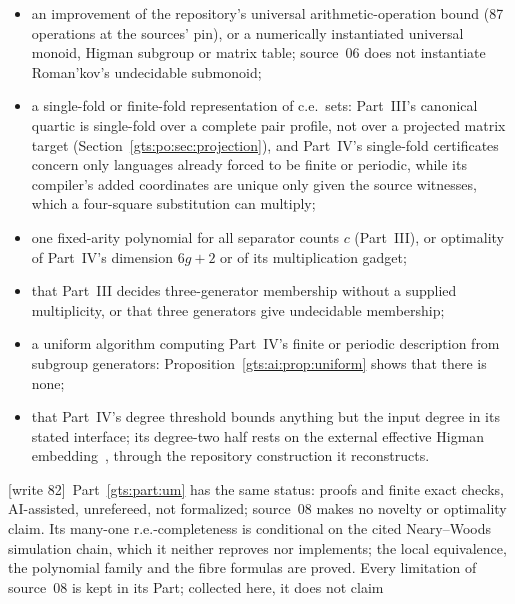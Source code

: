 \documentclass[11pt,letterpaper]{article}
\theoremstyle{definition}
\theoremstyle{remark}
\newcommand{\wtagc}{\textup{[write 82]}}
\begin{document}
\begin{itemize}
\item an improvement of the repository's universal arithmetic-operation bound (87 operations at the sources' pin), or a numerically instantiated universal monoid, Higman subgroup or matrix table; source~06 does not instantiate Roman'kov's undecidable submonoid;
\item a single-fold or finite-fold representation of c.e.\ sets: Part~III's canonical quartic is single-fold over a complete pair profile, not over a projected matrix target (Section~\ref{gts:po:sec:projection}), and Part~IV's single-fold certificates concern only languages already forced to be finite or periodic, while its compiler's added coordinates are unique only given the source witnesses, which a four-square substitution can multiply;
\item one fixed-arity polynomial for all separator counts $c$ (Part~III), or optimality of Part~IV's dimension $6g+2$ or of its multiplication gadget;
\item that Part~III decides three-generator membership without a supplied multiplicity, or that three generators give undecidable membership;
\item a uniform algorithm computing Part~IV's finite or periodic description from subgroup generators: Proposition~\ref{gts:ai:prop:uniform} shows that there is none;
\item that Part~IV's degree threshold bounds anything but the input degree in its stated interface; its degree-two half rests on the external effective Higman embedding~\cite{ai-mikaelian}, through the repository construction it reconstructs.
\end{itemize}
\wtagc\ Part~\ref{gts:part:um} has the same status: proofs and finite exact checks, AI-assisted, unrefereed, not formalized; source~08 makes no novelty or optimality claim. Its many-one r.e.-completeness is conditional on the cited Neary--Woods simulation chain, which it neither reproves nor implements; the local equivalence, the polynomial family and the fibre formulas are proved. Every limitation of source~08 is kept in its Part; collected here, it does not claim
\end{document}
